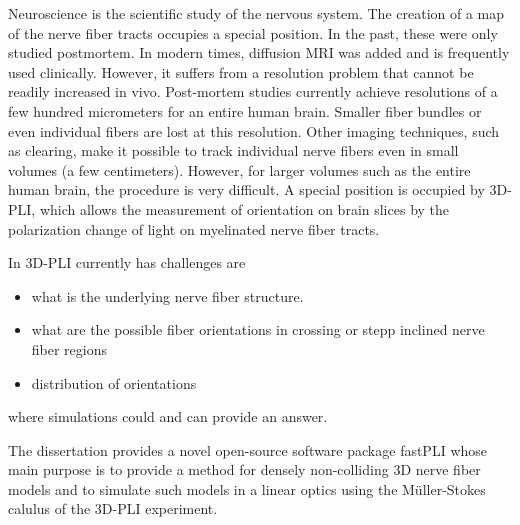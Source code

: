 % 
Neuroscience is the scientific study of the nervous system.
The creation of a map of the nerve fiber tracts occupies a special position.
In the past, these were only studied postmortem. 
In modern times, diffusion MRI was added and is frequently used clinically.
However, it suffers from a resolution problem that cannot be readily increased in vivo.
Post-mortem studies currently achieve resolutions of a few hundred micrometers for an entire human brain.
Smaller fiber bundles or even individual fibers are lost at this resolution.
Other imaging techniques, such as clearing, make it possible to track individual nerve fibers even in small volumes (a few centimeters).
However, for larger volumes such as the entire human brain, the procedure is very difficult.
A special position is occupied by \ac{3D-PLI}, which allows the measurement of orientation on brain slices by the polarization change of light on myelinated nerve fiber tracts.
\par
% 
In \ac{3D-PLI} currently has challenges are
\begin{itemize}
   \item what is the underlying nerve fiber structure.
   \item what are the possible fiber orientations in crossing or stepp inclined nerve fiber regions
   \item distribution of orientations
\end{itemize}
where simulations could and can provide an answer.
\par
% 
The dissertation provides a novel open-source software package \ac{fastPLI} whose main purpose is to provide a method for densely non-colliding 3D nerve fiber models and to simulate such models in a linear optics using the M\"{u}ller-Stokes calulus of the \ac{3D-PLI} experiment.
